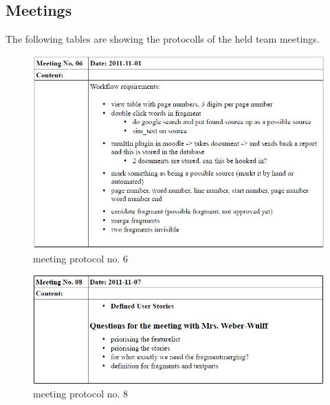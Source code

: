 \begin{appendix}

\chapter{Meetings}
The following tables are showing the protocolls of the held team meetings.

\begin{figure}[htbp]
  \centering
    \includegraphics[width=\textwidth]{images/a_meetings/meeting_6}
  \caption{meeting protocol no. 6}
  \label{fig:meeting protocol no. 6}
\end{figure}

\begin{figure}[htbp]
  \centering
    \includegraphics[width=\textwidth]{images/a_meetings/meeting_8}
  \caption{meeting protocol no. 8}
  \label{fig:meeting protocol no. 8}
\end{figure}


\end{appendix}
